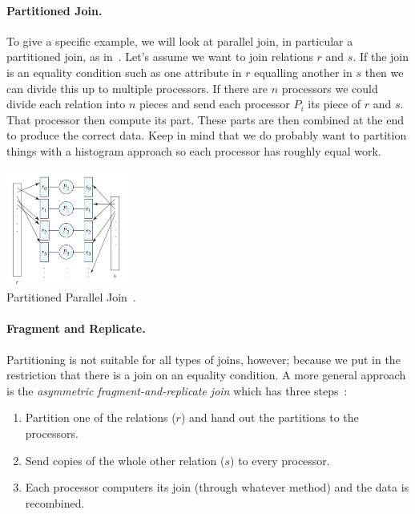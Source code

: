 \paragraph{Partitioned Join. }To give a specific example, we will look at parallel join, in particular a partitioned join, as in~\cite{dsc}. Let's assume we want to join relations $r$ and $s$. If the join is an equality condition such as one attribute in $r$ equalling another in $s$ then we can divide this up to multiple processors. If there are $n$ processors we could divide each relation into $n$ pieces and send each processor $P_{i}$ its piece of $r$ and $s$. That processor then compute its part. These parts are then combined at the end to produce the correct data. Keep in mind that we do probably want to partition things with a histogram approach so each processor has roughly equal work.

\begin{center}
\includegraphics[width=0.3\textwidth]{images/partitioned-parallel-join}\\
Partitioned Parallel Join~\cite{dsc}.
\end{center}

\paragraph{Fragment and Replicate.} Partitioning is not suitable for all types of joins, however; because we put in the restriction that there is a join on an equality condition. A more general approach is the \textit{asymmetric fragment-and-replicate join} which has three steps~\cite{dsc}:

\begin{enumerate}
\item Partition one of the relations ($r$) and hand out the partitions to the processors.
\item Send copies of the whole other relation ($s$) to every processor.
\item Each processor computers its join (through whatever method) and the data is recombined. 
\end{enumerate}

